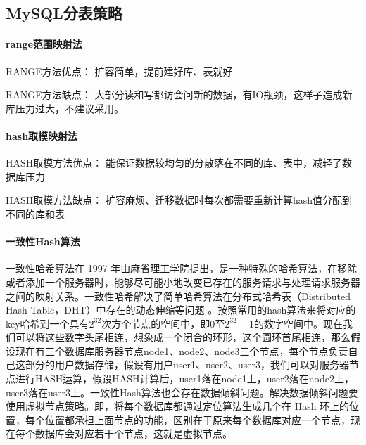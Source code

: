 \documentclass[../../../interview-questions.tex]{subfiles}
\begin{document}
\subsection{MySQL分表策略}

\paragraph{range范围映射法}

RANGE方法优点： 扩容简单，提前建好库、表就好

RANGE方法缺点： 大部分读和写都访会问新的数据，有IO瓶颈，这样子造成新库压力过大，不建议采用。

\paragraph{hash取模映射法}

HASH取模方法优点： 能保证数据较均匀的分散落在不同的库、表中，减轻了数据库压力

HASH取模方法缺点： 扩容麻烦、迁移数据时每次都需要重新计算hash值分配到不同的库和表

\paragraph{一致性Hash算法}

一致性哈希算法在 1997 年由麻省理工学院提出，是一种特殊的哈希算法，在移除或者添加一个服务器时，能够尽可能小地改变已存在的服务请求与处理请求服务器之间的映射关系。一致性哈希解决了简单哈希算法在分布式哈希表（Distributed Hash Table，DHT）中存在的动态伸缩等问题 。按照常用的hash算法来将对应的key哈希到一个具有$2^{32}$次方个节点的空间中，即0至$ 2^{32}-1$的数字空间中。现在我们可以将这些数字头尾相连，想象成一个闭合的环形，这个圆环首尾相连，那么假设现在有三个数据库服务器节点node1、node2、node3三个节点，每个节点负责自己这部分的用户数据存储，假设有用户user1、user2、user3，我们可以对服务器节点进行HASH运算，假设HASH计算后，user1落在node1上，user2落在node2上，user3落在user3上。一致性Hash算法也会存在数据倾斜问题。解决数据倾斜问题要使用虚拟节点策略。即，将每个数据库都通过定位算法生成几个在 Hash 环上的位置，每个位置都承担上面节点的功能，区别在于原来每个数据库对应一个节点，现在每个数据库会对应若干个节点，这就是虚拟节点。
\end{document}
